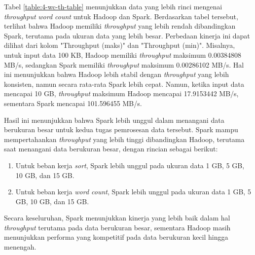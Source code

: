 Tabel \ref{table:4-wc-th-table} menunjukkan data yang lebih rinci mengenai \textit{throughput} \textit{word count} untuk Hadoop dan Spark. Berdasarkan tabel tersebut, terlihat bahwa Hadoop memiliki \textit{throughput} yang lebih rendah dibandingkan Spark, terutama pada ukuran data yang lebih besar.
Perbedaan kinerja ini dapat dilihat dari kolom "Throughput (maks)" dan "Throughput (min)". Misalnya, untuk input data 100 KB, Hadoop memiliki \textit{throughput} maksimum 0.00384808 MB/s, sedangkan Spark memiliki \textit{throughput} maksimum 0.00286102 MB/s. Hal ini menunjukkan bahwa Hadoop lebih stabil dengan \textit{throughput} yang lebih konsisten, namun secara rata-rata Spark lebih cepat. Namun, ketika input data mencapai 10 GB, \textit{throughput} maksimum Hadoop mencapai 17.9153442 MB/s, sementara Spark mencapai 101.596455 MB/s.

Hasil ini menunjukkan bahwa Spark lebih unggul dalam menangani data berukuran besar untuk kedua tugas pemrosesan data tersebut. Spark mampu mempertahankan \textit{throughput} yang lebih tinggi dibandingkan Hadoop, terutama saat menangani data berukuran besar, dengan rincian sebagai berikut:
\begin{enumerate}
\item Untuk beban kerja \textit{sort}, Spark lebih unggul pada ukuran data 1 GB, 5 GB, 10 GB, dan 15 GB.
\item Untuk beban kerja \textit{word count}, Spark lebih unggul pada ukuran data 1 GB, 5 GB, 10 GB, dan 15 GB.
\end{enumerate}

Secara keseluruhan, Spark menunjukkan kinerja yang lebih baik dalam hal \textit{throughput} terutama pada data berukuran besar, sementara Hadoop masih menunjukkan performa yang kompetitif pada data berukuran kecil hingga menengah.


